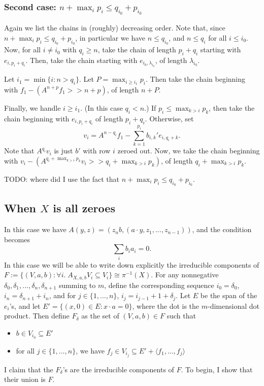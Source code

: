 \documentclass[12pt,psamsfonts]{article}
\begin{document}
\subsubsection{Second case: \(n + \max_i p_i \leq q_{i_0} + p_{i_0}\)}
Again we list the chains in (roughly) decreasing order.
Note that, since \(n + \max_i p_i \leq q_{i_0} + p_{i_0}\), in particular we have \(n \leq q_{i_0}\), and \(n \leq q_i\) for all \(i \leq i_0\).
Now, for all \(i \neq i_0\) with \(q_i \geq n\), take the chain of length \(p_i + q_i\) starting with \(e_{i,p_i + q_i}\).
Then, take the chain starting with \(e_{i_0, \lambda_{i_0}}\), of length \(\lambda_{i_0}\).
\par Let \(i_1 = \min\{i : n > q_i\}\).
Let \(P = \max_{i \geq i_1} p_i\).
Then take the chain beginning with \(f_1 - (A^{n + p} f_1 >> n + p)\), of length  \(n + P\).
\par Finally, we handle \(i \geq i_1\).  
(In this case \(q_i < n\).)
If \(p_i \leq \max_{k > i} p_k\), then take the chain beginning with \(e_{i, p_i + q_i}\) of length \(p_i + q_i\).
Otherwise, set 
\[v_i = A^{n - q_i} f_1 - \sum_{k = 1}^{p_i} b_{i,k}' e_{i, q_i + k}.\]
Note that \(A^{q_i} v_i\) is just \(b'\) with row \(i\) zeroed out.
Now, we take the chain beginning with \(v_i - (A^{q_i + \max_{k > i} p_k} v_i >> q_i + \max_{k > i} p_k)\), of length \(q_i + \max_{k > i} p_k\).
\par TODO: where did I use the fact that \(n + \max_i p_i \leq q_{i_0} + p_{i_0}\).

\subsection{When \(X\) is all zeroes}
In this case we have \(A(y, z) = (z_n b, (a \cdot y, z_1, ..., z_{n - 1}))\), and the condition becomes
\[\sum_i b_i a_i = 0.\]
In this case we will be able to write down explicitly the irreducible components of \(F := \{(V, a, b) : \forall i. \; A_{X, a, b} V_i \subseteq V_i\} \cong \pi^{-1}(X)\).
For any nonnegative \(\delta_0, \delta_1, ..., \delta_n, \delta_{n + 1}\) summing to \(m\), define the corresponding sequence \(i_0 = \delta_0\), \(i_n = \delta_{n + 1} + i_n\), and for \(j \in \{1, ..., n\}\), \(i_j = i_{j - 1} + 1 + \delta_j\).
Let \(E\) be the span of the \(e_i\)'s, and let \(E' = \{(x, 0) \in E : x \cdot a = 0\}\), where the dot is the \(m\)-dimensional dot product.
Then define \(F_\delta\) as the set of \((V, a, b) \in F\) such that 
\begin{itemize}
    \item \(b \in V_{i_0} \subseteq E'\)
    \item for all \(j \in \{1, ..., n\}\), we have \(f_j \in V_{i_j} \subseteq E' + \langle f_1, ..., f_j \rangle\)
\end{itemize}
I claim that the \(F_\delta\)'s are the irreducible components of \(F\).
To begin, I show that their union is \(F\).
\end{document}
